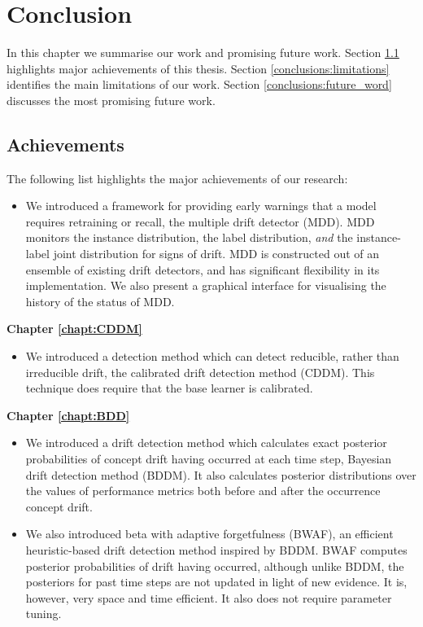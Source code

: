 \chapter{Conclusion} \label{chapt:Conclusion}

In this chapter we summarise our work and promising future work. Section \ref{conclusion:achievements} highlights major achievements of this thesis. Section \ref{conclusions:limitations} identifies the main limitations of our work. Section \ref{conclusions:future_word} discusses the most promising future work.


\section{Achievements} \label{conclusion:achievements}

The following list highlights the major achievements of our research:

\begin{itemize}
  \item We introduced a framework for providing early warnings that a model requires retraining or recall, the multiple drift detector (MDD). MDD monitors the instance distribution, the label distribution, {\it and} the instance-label joint distribution for signs of drift. MDD is constructed out of an ensemble of existing drift detectors, and has significant flexibility in its implementation. We also present a graphical interface for visualising the history of the status of MDD.
\end{itemize}
{\bf Chapter \ref{chapt:CDDM}}
\begin{itemize}
  \item We introduced a detection method which can detect reducible, rather than irreducible drift, the calibrated drift detection method (CDDM). This technique does require that the base learner is calibrated.
\end{itemize}
{\bf Chapter \ref{chapt:BDD}}
\begin{itemize}
  \item We introduced a drift detection method which calculates exact posterior probabilities of concept drift having occurred at each time step, Bayesian drift detection method (BDDM). It also calculates posterior distributions over the values of performance metrics both before and after the occurrence concept drift.
  \item We also introduced beta with adaptive forgetfulness (BWAF), an efficient heuristic-based drift detection method inspired by BDDM. BWAF computes posterior probabilities of drift having occurred, although unlike BDDM, the posteriors for past time steps are not updated in light of new evidence. It is, however, very space and time efficient. It also does not require parameter tuning.
\end{itemize}

